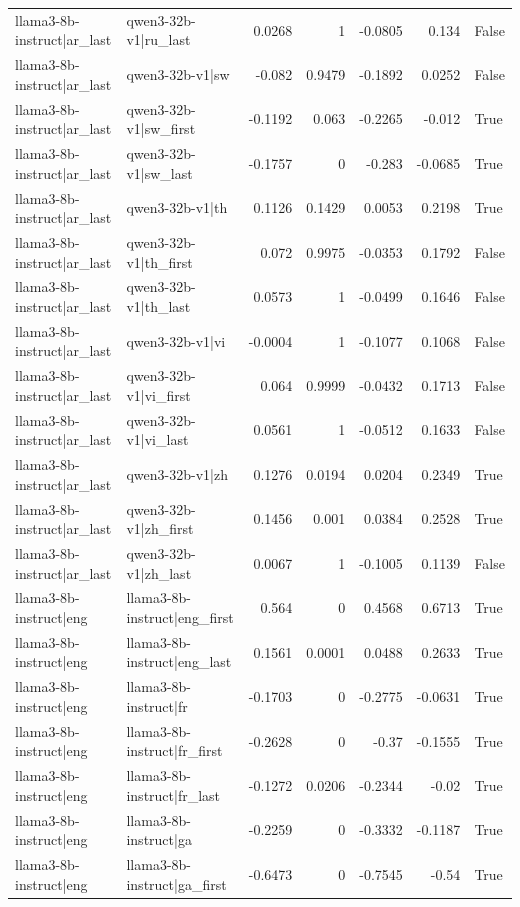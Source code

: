 \begin{table}
\begin{tabular}{l l r r r r l}
llama3-8b-instruct|ar_last & qwen3-32b-v1|ru_last & 0.0268 & 1 & -0.0805 & 0.134 & False \\
llama3-8b-instruct|ar_last & qwen3-32b-v1|sw & -0.082 & 0.9479 & -0.1892 & 0.0252 & False \\
llama3-8b-instruct|ar_last & qwen3-32b-v1|sw_first & -0.1192 & 0.063 & -0.2265 & -0.012 & True \\
llama3-8b-instruct|ar_last & qwen3-32b-v1|sw_last & -0.1757 & 0 & -0.283 & -0.0685 & True \\
llama3-8b-instruct|ar_last & qwen3-32b-v1|th & 0.1126 & 0.1429 & 0.0053 & 0.2198 & True \\
llama3-8b-instruct|ar_last & qwen3-32b-v1|th_first & 0.072 & 0.9975 & -0.0353 & 0.1792 & False \\
llama3-8b-instruct|ar_last & qwen3-32b-v1|th_last & 0.0573 & 1 & -0.0499 & 0.1646 & False \\
llama3-8b-instruct|ar_last & qwen3-32b-v1|vi & -0.0004 & 1 & -0.1077 & 0.1068 & False \\
llama3-8b-instruct|ar_last & qwen3-32b-v1|vi_first & 0.064 & 0.9999 & -0.0432 & 0.1713 & False \\
llama3-8b-instruct|ar_last & qwen3-32b-v1|vi_last & 0.0561 & 1 & -0.0512 & 0.1633 & False \\
llama3-8b-instruct|ar_last & qwen3-32b-v1|zh & 0.1276 & 0.0194 & 0.0204 & 0.2349 & True \\
llama3-8b-instruct|ar_last & qwen3-32b-v1|zh_first & 0.1456 & 0.001 & 0.0384 & 0.2528 & True \\
llama3-8b-instruct|ar_last & qwen3-32b-v1|zh_last & 0.0067 & 1 & -0.1005 & 0.1139 & False \\
llama3-8b-instruct|eng & llama3-8b-instruct|eng_first & 0.564 & 0 & 0.4568 & 0.6713 & True \\
llama3-8b-instruct|eng & llama3-8b-instruct|eng_last & 0.1561 & 0.0001 & 0.0488 & 0.2633 & True \\
llama3-8b-instruct|eng & llama3-8b-instruct|fr & -0.1703 & 0 & -0.2775 & -0.0631 & True \\
llama3-8b-instruct|eng & llama3-8b-instruct|fr_first & -0.2628 & 0 & -0.37 & -0.1555 & True \\
llama3-8b-instruct|eng & llama3-8b-instruct|fr_last & -0.1272 & 0.0206 & -0.2344 & -0.02 & True \\
llama3-8b-instruct|eng & llama3-8b-instruct|ga & -0.2259 & 0 & -0.3332 & -0.1187 & True \\
llama3-8b-instruct|eng & llama3-8b-instruct|ga_first & -0.6473 & 0 & -0.7545 & -0.54 & True \\

\end{tabular}
\end{table}
